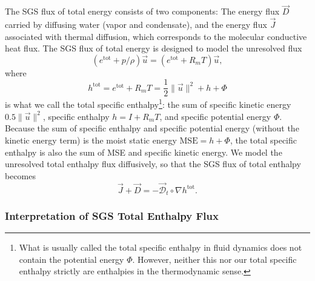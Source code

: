 \documentclass{report}
\begin{document}
The SGS flux of total energy consists of two components: The energy flux $\vec{D}$ carried by diffusing water (vapor and condensate), and the energy flux $\vec{J}$ associated with thermal diffusion, which corresponds to the molecular conductive heat flux. The SGS flux of total energy is designed to model the unresolved flux 
\[
(e^{\mathrm{tot}} + p/\rho) \vec{u} = (e^{\mathrm{tot}} + R_m T) \vec{u}, 
\]
where
\[
h^{\mathrm{tot}} = e^{\mathrm{tot}} + R_m T = \frac{1}{2} \| \vec{u} \|^2 + h + \Phi
\]
is what we call the total specific enthalpy\footnote{What is usually called the total specific enthalpy in fluid dynamics does not contain the potential energy $\Phi$. However, neither this nor our total specific enthalpy strictly are enthalpies in the thermodynamic sense.}: the sum of specific kinetic energy $0.5 \| \vec{u} \|^2$, specific enthalpy $h = I + R_m T$, and specific potential energy $\Phi$. Because the sum of specific enthalpy and specific potential energy (without the kinetic energy term) is the moist static energy $\mathrm{MSE} = h + \Phi$, the total specific enthalpy is also the sum of MSE and specific kinetic energy. We model the unresolved total enthalpy flux diffusively, so that the SGS flux of total enthalpy becomes
\begin{equation}\label{e:SGS_energy_flux}
\vec{J} + \vec{D} = - \vec{\mathcal{D}}_t \circ \nabla h^{\mathrm{tot}}.
\end{equation}

\subsubsection{Interpretation of SGS Total Enthalpy Flux}
\end{document}
